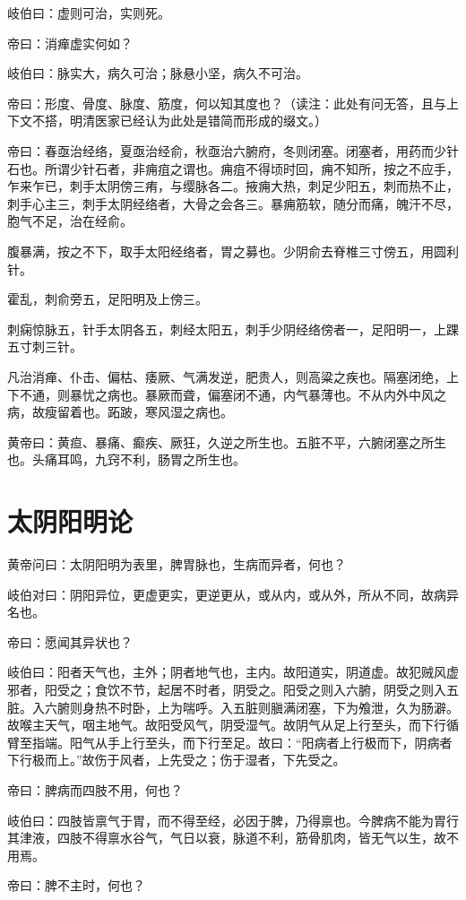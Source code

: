 \documentclass{article}%
\begin{document}
岐伯曰：虚则可治，实则死。

帝曰：消瘅虚实何如？

岐伯曰：脉实大，病久可治；脉悬小坚，病久不可治。

帝曰：形度、骨度、脉度、筋度，何以知其度也？（读注：此处有问无答，且与上下文不搭，明清医家已经认为此处是错简而形成的缀文。）

帝曰：春亟治经络，夏亟治经俞，秋亟治六腑府，冬则闭塞。闭塞者，用药而少针石也。所谓少针石者，非痈疽之谓也。痈疽不得顷时回，痈不知所，按之不应手，乍来乍已，刺手太阴傍三痏，与缨脉各二。掖痈大热，刺足少阳五，刺而热不止，刺手心主三，刺手太阴经络者，大骨之会各三。暴痈筋软，随分而痛，魄汗不尽，胞气不足，治在经俞。

腹暴满，按之不下，取手太阳经络者，胃之募也。少阴俞去脊椎三寸傍五，用圆利针。

霍乱，刺俞旁五，足阳明及上傍三。

刺痫惊脉五，针手太阴各五，刺经太阳五，刺手少阴经络傍者一，足阳明一，上踝五寸刺三针。

凡治消瘅、仆击、偏枯、痿厥、气满发逆，肥贵人，则高粱之疾也。隔塞闭绝，上下不通，则暴忧之病也。暴厥而聋，偏塞闭不通，内气暴薄也。不从内外中风之病，故瘦留着也。跖跛，寒风湿之病也。

黄帝曰：黄疸、暴痛、癫疾、厥狂，久逆之所生也。五脏不平，六腑闭塞之所生也。头痛耳鸣，九窍不利，肠胃之所生也。
\section{太阴阳明论}
黄帝问曰：太阴阳明为表里，脾胃脉也，生病而异者，何也？

岐伯对曰：阴阳异位，更虚更实，更逆更从，或从内，或从外，所从不同，故病异名也。

帝曰：愿闻其异状也？

岐伯曰：阳者天气也，主外；阴者地气也，主内。故阳道实，阴道虚。故犯贼风虚邪者，阳受之；食饮不节，起居不时者，阴受之。阳受之则入六腑，阴受之则入五脏。入六腑则身热不时卧，上为喘呼。入五脏则䐜满闭塞，下为飧泄，久为肠澼。故喉主天气，咽主地气。故阳受风气，阴受湿气。故阴气从足上行至头，而下行循臂至指端。阳气从手上行至头，而下行至足。故曰：“阳病者上行极而下，阴病者下行极而上。”故伤于风者，上先受之；伤于湿者，下先受之。

帝曰：脾病而四肢不用，何也？

岐伯曰：四肢皆禀气于胃，而不得至经，必因于脾，乃得禀也。今脾病不能为胃行其津液，四肢不得禀水谷气，气日以衰，脉道不利，筋骨肌肉，皆无气以生，故不用焉。

帝曰：脾不主时，何也？
\end{document}
